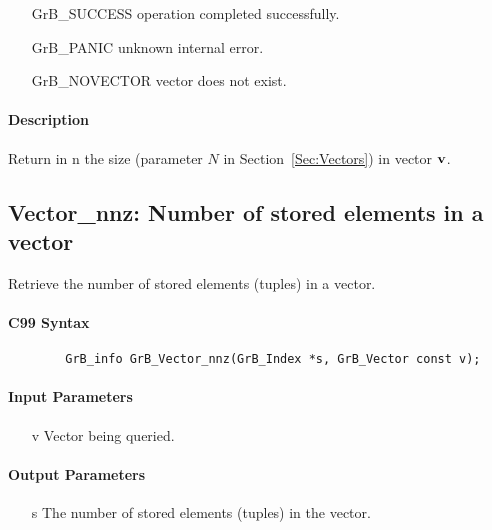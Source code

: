 \begin{itemize}[leftmargin=2.1in]
\item[{\sf GrB\_SUCCESS}]   operation completed successfully.
\item[{\sf GrB\_PANIC}]     unknown internal error.
\item[{\sf GrB\_NOVECTOR}]  vector does not exist.
\end{itemize}

\paragraph{Description}

Return in {\sf n} the size (parameter $N$ in Section~\ref{Sec:Vectors}) in vector ${\bf v}$.

\subsection{{\sf Vector\_nnz}: Number of stored elements in a vector}

Retrieve the number of stored elements (tuples) in a vector.

\paragraph{C99 Syntax}

\begin{verbatim}
        GrB_info GrB_Vector_nnz(GrB_Index *s, GrB_Vector const v);
\end{verbatim}

\paragraph{Input Parameters}

\begin{itemize}[leftmargin=1.1in]
    \item[{\sf v}] Vector being queried.
\end{itemize}

\paragraph{Output Parameters}
\begin{itemize}[leftmargin=1.1in]
    \item[{\sf s}] The number of stored elements (tuples) in the vector.
\end{itemize}

